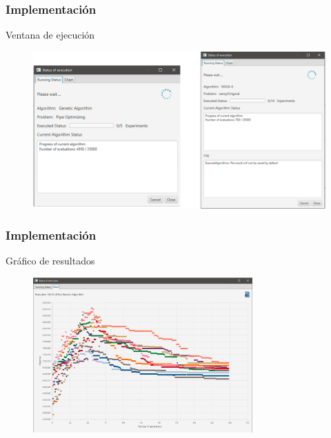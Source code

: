 \documentclass[9pt]{beamer}
\begin{document}
    \begin{frame}
        \frametitle{Implementación}
        Ventana de ejecución               
        \begin{figure}
            \includegraphics[width=\textwidth]{assets/Interfaces/EstadoEjecucion.png}
        \end{figure}
    \end{frame}

    \begin{frame}
        \frametitle{Implementación}
        Gráfico de resultados                  
        \begin{figure}
            \includegraphics[width=0.75\textwidth]{assets/Interfaces/GraficoResultados.png}
        \end{figure}
    \end{frame}
\end{document}
